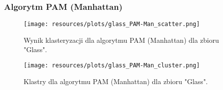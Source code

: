   \subsubsection{Algorytm PAM (Manhattan)} 
    \begin{figure}[H]
      \center
      \texttt{[image: resources/plots/glass\_PAM-Man\_scatter.png]}
      \caption{Wynik klasteryzacji dla algorytmu PAM (Manhattan) dla zbioru "Glass".}
    \end{figure}
    \begin{figure}[H]
      \center
      \texttt{[image: resources/plots/glass\_PAM-Man\_cluster.png]}
      \caption{Klastry dla algorytmu PAM (Manhattan) dla zbioru "Glass".}
    \end{figure}
